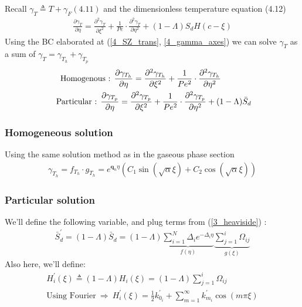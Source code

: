 \documentclass[12pt]{article}
\numberwithin{equation}{section}
\begin{document}
\begin{flushleft}
Recall $\gamma_{T} \triangleq T+\gamma_{F}(4.11)$ and the dimensionless temperature equation (4.12)
\begin{align}
\frac{\partial \gamma_{T}}{\partial \eta}=\frac{\partial^{2} \gamma_{T}}{\partial \xi^{2}}+\frac{1}{P e} \cdot \frac{\partial^{2} \gamma_{T}}{\partial \eta^{2}}+(1-\Lambda) S_{d} H(c-\xi)
\end{align}
Using the BC elaborated at (\ref{4_SZ_trans}, \ref{4_gamma_axes}) we can solve $\gamma_{T}$ as a sum of $\gamma_{T}=\gamma_{T_{h}}+\gamma_{T_{p}}$
\begin{align}
\text { Homogenous : } \frac{\partial \gamma_{T_{h}}}{\partial \eta}=\frac{\partial^{2} \gamma_{T_{h}}}{\partial \xi^{2}}+\frac{1}{P e^{2}} \cdot \frac{\partial^{2} \gamma_{T_{h}}}{\partial \eta^{2}} \hspace{13mm} \\
\text { Particular : } \frac{\partial \gamma_{T_{p}}}{\partial \eta}=\frac{\partial^{2} \gamma_{T_{p}}}{\partial \xi^{2}}+\frac{1}{P e^{2}} \cdot \frac{\partial^{2} \gamma_{T_{p}}}{\partial \eta^{2}}+(1-\Lambda) \bar{S}_{d}
\end{align}

\subsubsection*{Homogeneous solution}

Using the same solution method as in the gaseous phase section
\begin{align}
\gamma_{T_{h}}=f_{T_{h}} \cdot g_{T_{h}}=e^{\mathbf{q}_{n} \eta}\left(C_{1} \sin (\sqrt{\alpha} \xi)+C_{2} \cos (\sqrt{\alpha} \xi)\right)
\end{align}

\subsubsection*{Particular solution}

We'll define the following variable, and plug terms from (\ref{3_heaviside}) :
\begin{align}
\bar{S}_{d}^{\prime}=(1-\Lambda) \bar{S}_{d}=(1-\Lambda) \underbrace{\sum_{i=1}^{N} \Delta_{i} e^{-\Delta_i \eta}}_{f(\eta)} \underbrace{\sum_{j=1}^{i} \Omega_{i j}}_{g(\xi)}
\end{align}
Also here, we'll define:
\begin{align}
H_{i}^{\prime}(\xi) \triangleq(1-\Lambda) H_{i}(\xi)=(1-\Lambda) \sum_{j=1}^{i} \Omega_{i j} \\
\text{Using Fourier} \ \Rightarrow \ H_{i}^{\prime}(\xi)=\frac{1}{2} k_{0_{i}}^{\prime}+\sum_{m=1}^{\infty} k_{m_{i}}^{\prime} \cos (m \pi \xi)
\end{align}


\end{flushleft}
\end{document}
